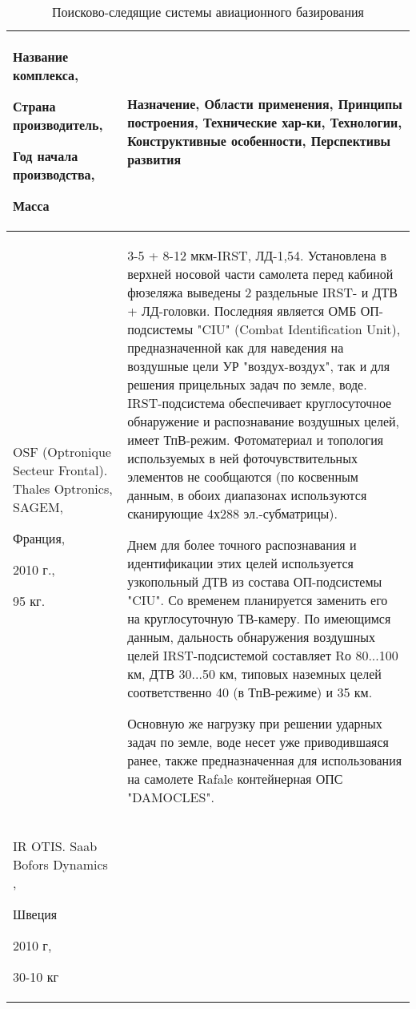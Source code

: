 \begin{landscape}

\begin{longtable}{| p{6cm} | p{18cm} |}
	\caption{Поисково-следящие системы авиационного базирования}%
	\label{tab:EOS}%
	\\ \hline
		Название комплекса, 
		
		Страна производитель, 
		
		Год начала производства, 
		
		Масса 
		& 
		Назначение, Области применения, Принципы построения, Технические хар-ки, Технологии, Конструктивные особенности, Перспективы развития 
	\\ \hline
		OSF (Optronique Secteur Frontal). Thales Optronics, SAGEM, \cite[]{OSF}
		
		Франция, 
		
		2010 г., 
		
		95 кг. 
	& 
		\small 3-5 + 8-12 мкм-IRST, ЛД-1,54. Установлена в верхней носовой части самолета перед кабиной фюзеляжа выведены 2 раздельные IRST- и ДТВ + ЛД-головки. Последняя является ОМБ ОП-подсистемы "CIU" (Combat Identification Unit), предназначенной как для наведения на воздушные цели УР "воздух-воздух", так и для решения прицельных задач по земле, воде. 
	    \small IRST-подсистема обеспечивает круглосуточное обнаружение и распознавание воздушных целей, имеет ТпВ-режим. Фотоматериал и топология используемых в ней фоточувствительных элементов не сообщаются (по косвенным данным, в обоих диапазонах используются сканирующие 4х288 эл.-субматрицы). 
		
		
		\small Днем для более точного распознавания и идентификации этих целей используется узкопольный ДТВ из состава ОП-подсистемы "CIU". Со временем планируется заменить его на круглосуточную ТВ-камеру. По имеющимся данным, дальность обнаружения воздушных целей IRST-подсистемой составляет Rо 80...100 км, ДТВ 30...50 км, типовых наземных целей соответственно 40 (в ТпВ-режиме) и 35 км. 
		
		\small Основную же нагрузку при решении ударных задач по земле, воде несет уже приводившаяся ранее, также предназначенная для использования на самолете Rafale контейнерная ОПС "DAMOCLES".
	\\ \hline
		IR OTIS. Saab Bofors Dynamics \cite[]{doi:10.1117/12.450557},
		
		Швеция	
		
		2010 г,	
		
		30-10 кг
		 

\end{longtable}
\end{landscape}

